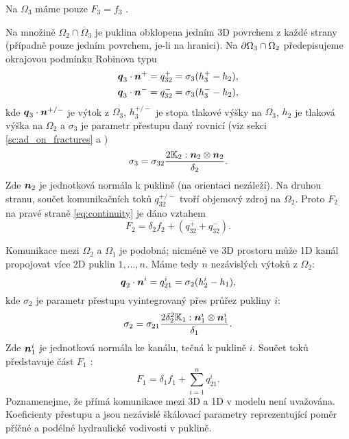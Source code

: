 Na $\Omega_3$ máme pouze $F_3  = f_3$ .

Na množině $\Omega_2 \cap \overline\Omega_3$ je puklina obklopena jedním 3D povrchem z každé strany (případně pouze jedním povrchem, je-li  na hranici).
Na $\partial\Omega_3 \cap \Omega_2$ předepisujeme okrajovou podmínku Robinova typu
\begin{align*}
        \mathbf{\boldsymbol{q}}_3\cdot \mathbf{\boldsymbol{n}}^{+} &= q_{32}^{+} =\sigma_{3} (h_3^{+}-h_2),\\
        \mathbf{\boldsymbol{q}}_3\cdot \mathbf{\boldsymbol{n}}^{-} &= q_{32}^{-} =\sigma_{3} (h_3^{-}-h_2),
\end{align*}
kde $\mathbf{\boldsymbol{q}}_3\cdot\mathbf{\boldsymbol{n}}^{+/-}$  je výtok z $\Omega_3$, $h_3^{+/-}$ je
stopa tlakové výšky na $\Omega_3$, $h_2$ je tlaková výška na $\Omega_2$ a
$\sigma_{3}$  je parametr přestupu daný rovnicí (viz sekci \ref{sc:ad_on_fractures} a \cite{martin_modeling_2005})
\[
\label{e:sigma3_law}
  \sigma_3 = \sigma_{32} \frac{2{\mathbb{K}}_2 :\mathbf{\boldsymbol{n}}_2\otimes\mathbf{\boldsymbol{n}}_2 }{\delta_2}.
\]
Zde $\mathbf{\boldsymbol{n}}_2$ je jednotková normála k puklině (na orientaci nezáleží).
Na druhou stranu, součet komunikačních toků $q_{32}^{+/-}$ tvoří
objemový zdroj na $\Omega_2$.  Proto $F_2$  na pravé straně \eqref{eq:continuity} je dáno vztahem
\begin{equation}
   \label{source_2D}
   F_2 = \delta_2 f_2 + (q_{32}^{+} + q_{32}^{-}).
\end{equation}

Komunikace mezi $\Omega_2$  a  $\Omega_1$ je podobná; nicméně ve 3D prostoru
může 1D kanál propojovat více 2D puklin $1,\dots, n$. Máme tedy $n$
nezávislých výtoků z $\Omega_2$:
\begin{equation*}
        \mathbf{\boldsymbol{q}}_2\cdot \mathbf{\boldsymbol{n}}^{i} = q_{21}^{i} =\sigma_{2} (h_2^{i}-h_1),
\end{equation*}
kde $\sigma_2$  je parametr přestupu vyintegrovaný přes průřez pukliny $i$:
\[
\label{e:sigma2_law}
  \sigma_2 = \sigma_{21} \frac{2\delta_2^2{\mathbb{K}}_1:{\mathbf{\boldsymbol{n}}_1^i}\otimes{\mathbf{\boldsymbol{n}}_1^i}}{\delta_1}.
\]
Zde $\mathbf{\boldsymbol{n}}_1^i$ je jednotková normála ke kanálu, tečná k puklině $i$.
Součet toků představuje část $F_1$ :
\begin{equation}
   \label{source_1D}
   F_1 = \delta_1 f_1 + \sum_{i=1}^n q_{21}^{i}. 
\end{equation}
Poznamenejme, že přímá komunikace mezi 3D a 1D v modelu není uvažována.
Koeficienty přestupu
 \units{}{}{} a
 \units{}{}{} jsou nezávislé škálovací parametry reprezentující poměr příčné a podélné hydraulické vodivosti v puklině.


